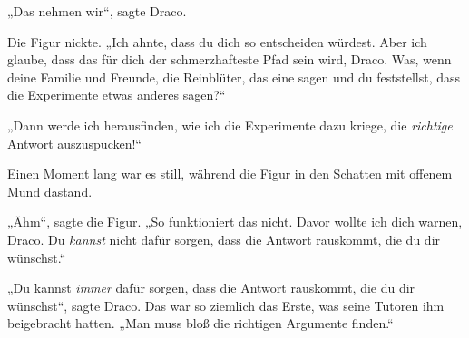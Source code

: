 „Das nehmen wir“, sagte Draco.

Die Figur nickte.
„Ich ahnte, dass du dich so entscheiden würdest. Aber ich glaube, dass das für dich der schmerzhafteste Pfad sein wird, Draco. Was, wenn deine Familie und Freunde, die Reinblüter, das eine sagen und du feststellst, dass die Experimente etwas anderes sagen?“

„Dann werde ich herausfinden, wie ich die Experimente dazu kriege, die \emph{richtige} Antwort auszuspucken!“

Einen Moment lang war es still, während die Figur in den Schatten mit offenem Mund dastand.

„Ähm“, sagte die Figur.
„So funktioniert das nicht. Davor wollte ich dich warnen, Draco. Du \emph{kannst} nicht dafür sorgen, dass die Antwort rauskommt, die du dir wünschst.“

„Du kannst \emph{immer} dafür sorgen, dass die Antwort rauskommt, die du dir wünschst“, sagte Draco. Das war so ziemlich das Erste, was seine Tutoren ihm beigebracht hatten.
„Man muss bloß die richtigen Argumente finden.“


